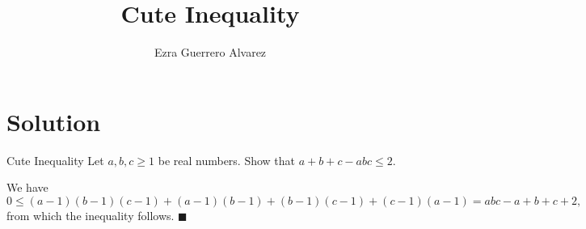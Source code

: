 \documentclass[14pt]{article}
\title{Cute Inequality}
\author{Ezra Guerrero Alvarez}
\begin{document}
\maketitle
	
\section*{Solution}

\begin{statement}{Cute Inequality}
	Let $a,b,c\ge1$ be real numbers. Show that $a+b+c-abc\le 2$. 
\end{statement}
We have
\[ 0\le (a-1)(b-1)(c-1)+(a-1)(b-1)+(b-1)(c-1)+(c-1)(a-1)=abc-a+b+c+2, \]
from which the inequality follows. $\blacksquare$
	
\end{document}
